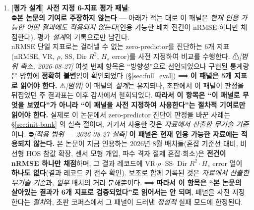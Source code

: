 \documentclass[11pt]{report}
\numberwithin{equation}{chapter}
\numberwithin{figure}{chapter}
\numberwithin{table}{chapter}
\begin{document}
\begin{enumerate}
  \item \textbf{[평가 설계] 사전 지정 6-지표 평가 패널}: \\
        ⛔\textbf{본 논문의 기여로 주장하지 않는다} --- 아래가 적는 대로 이 패널은
        \emph{현재 인용 가능한 어떤 결과에도 적용되지 않는다}(인용 가능한 배치 전건이
        nRMSE 하나만 채점한다). 평가 \emph{설계}의 기록으로만 남긴다. \\
        nRMSE 단일 지표로는 걸러낼 수 없는 zero-predictor를 진단하는
        6개 지표(nRMSE, VR, $\rho$, SS, Dir $R^2$, $H_s$ error)를
        사전 지정하여 비교를 수행한다.
        ⚠\emph{[범위 축소, 2026-08-27]} 여섯 번째 항목은 ``방향성''으로 선언되었으나
        구현된 통계량은 방향에 \textbf{정확히 불변}임이 확인되었다
        (\S\ref{sec:full_eval}) ⟹ \textbf{이 패널은 5개 지표로 읽어야 한다.}
        ⚠\emph{[범위]} 이 패널의 \emph{설계}는 유지되나, 초판에서 이 패널이 판정을 뒤집었던
        주 결과표는 이후 감사에서 철회되었다. \textbf{따라서 이 항목은 ``이 패널로 무엇을
        보였다''가 아니라 ``이 패널을 사전 지정하여 사용한다''는 절차적 기여로만 읽어야 한다.}
        실제로 이 논문에서 zero-predictor 진단이 판정을 바꾼 사례는 \S\ref{sec:init-bank} 의
        실측 절이며, 거기서 사용한 것은 \emph{자료에서 산출한 무기술 기준}이다.
        ⛔\emph{[적용 범위 --- 2026-08-27 실측]} \textbf{이 패널은 현재 인용 가능한 자료에는
        적용되지 않는다.} 본 논문이 지금 인용하는 2026년 8월 배치들(혼잡 기준선 대비,
        비선형 HOS 참값 확장, 센서 모형 개입, 파수 격자 절제 혼잡$\cdot$희소)은
        \textbf{전건이 nRMSE 하나만 채점}하며, 그 결과 레코드에 VR$\cdot\rho\cdot$SS$\cdot$
        Dir $R^2\cdot H_s$ error 열이 \textbf{하나도 없다}(결과 레코드 키 전수 확인).
        보조로 함께 기록된 것은 \emph{자료에서 산출한 무기술 기준}과, \emph{일부} 배치의
        거리 분해뿐이다.
        ⟹ \textbf{따라서 이 항목은 ``본 논문의 살아있는 결과가 6개 지표로 검증되었다''로
        읽어서는 안 되며}, 패널을 사전 지정한다는 \emph{절차}와, 초판 코퍼스에서 그 패널이
        드러낸 \emph{정성적} 실패 모드에 한정된다.
\end{enumerate}
\end{document}
